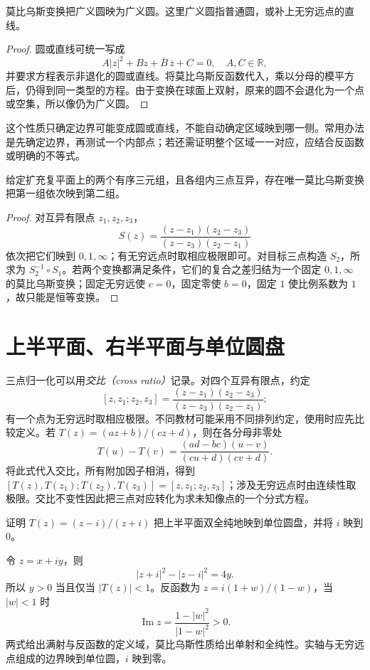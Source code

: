 \begin{proposition}[广义圆的保持性]
莫比乌斯变换把广义圆映为广义圆。这里广义圆指普通圆，或补上无穷远点的直线。
\end{proposition}
\begin{proof}
圆或直线可统一写成
\[
 A|z|^2+Bz+\overline B\,\overline z+C=0,
 \quad A,C\in\mathbb R,
\]
并要求方程表示非退化的圆或直线。将莫比乌斯反函数代入，乘以分母的模平方后，仍得到同一类型的方程。由于变换在球面上双射，原来的圆不会退化为一个点或空集，所以像仍为广义圆。
\end{proof}

这个性质只确定边界可能变成圆或直线，不能自动确定区域映到哪一侧。常用办法是先确定边界，再测试一个内部点；若还需证明整个区域一一对应，应结合反函数或明确的不等式。

\begin{proposition}[三点确定变换]
给定扩充复平面上的两个有序三元组，且各组内三点互异，存在唯一莫比乌斯变换把第一组依次映到第二组。
\end{proposition}
\begin{proof}
对互异有限点 $z_1,z_2,z_3$，
\[
 S(z)=\frac{(z-z_1)(z_2-z_3)}{(z-z_3)(z_2-z_1)}
\]
依次把它们映到 $0,1,\infty$；有无穷远点时取相应极限即可。对目标三点构造 $S_2$，所求为 $S_2^{-1}\circ S_1$。若两个变换都满足条件，它们的复合之差归结为一个固定 $0,1,\infty$ 的莫比乌斯变换；固定无穷远使 $c=0$，固定零使 $b=0$，固定 $1$ 使比例系数为 $1$，故只能是恒等变换。
\end{proof}

\section{上半平面、右半平面与单位圆盘}

三点归一化可以用\emph{交比（cross ratio）}记录。对四个互异有限点，约定
\[
 [z,z_1;z_2,z_3]
 =\frac{(z-z_1)(z_2-z_3)}{(z-z_3)(z_2-z_1)};
\]
有一个点为无穷远时取相应极限。不同教材可能采用不同排列约定，使用时应先比较定义。若 $T(z)=(az+b)/(cz+d)$，则在各分母非零处
\[
 T(u)-T(v)=\frac{(ad-bc)(u-v)}{(cu+d)(cv+d)}.
\]
将此式代入交比，所有附加因子相消，得到
$[T(z),T(z_1);T(z_2),T(z_3)]=[z,z_1;z_2,z_3]$；涉及无穷远点时由连续性取极限。交比不变性因此把三点对应转化为求未知像点的一个分式方程。

\begin{example}[凯莱变换]
\label{ex:ca-cayley}
证明 $T(z)=(z-i)/(z+i)$ 把上半平面双全纯地映到单位圆盘，并将 $i$ 映到 $0$。
\end{example}
\begin{solve}
令 $z=x+iy$，则
\[
 |z+i|^2-|z-i|^2=4y.
\]
所以 $y>0$ 当且仅当 $|T(z)|<1$。反函数为 $z=i(1+w)/(1-w)$，当 $|w|<1$ 时
\[
 \operatorname{Im}z=\frac{1-|w|^2}{|1-w|^2}>0.
\]
两式给出满射与反函数的定义域，莫比乌斯性质给出单射和全纯性。实轴与无穷远点组成的边界映到单位圆，$i$ 映到零。
\end{solve}

